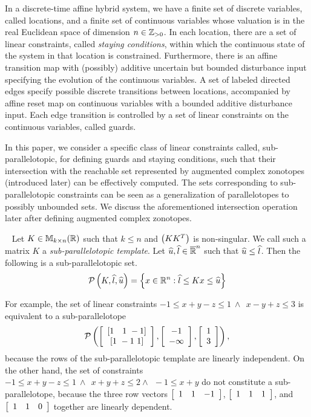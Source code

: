 
In a discrete-time affine hybrid system, we have a finite set of
discrete variables, called locations, and a finite set of continuous
variables whose valuation is in the real Euclidean space of dimension
$n\in\mathbb{Z}_{> 0}$.  In each location, there are a set of linear constraints,
called \emph{staying conditions}, within which the continuous state of
the system in that location is constrained.  Furthermore, there is an
affine transition map with (possibly) additive uncertain but bounded
disturbance input specifying the evolution of the continuous
variables. A set of labeled directed edges specify possible discrete
transitions between locations, accompanied by affine reset map on
continuous variables with a bounded additive disturbance input. Each
edge transition is controlled by a set of linear constraints on the
continuous variables, called guards.

In this paper, we consider a specific class of linear constraints
called, sub-parallelotopic, for defining guards and staying
conditions, such that their intersection with the reachable set
represented by augmented complex zonotopes (introduced later) can be
effectively computed. The sets corresponding to sub-parallelotopic
constraints can be seen as a generalization of parallelotopes to
possibly unbounded sets.  We discuss the aforementioned intersection
operation later after defining augmented complex zonotopes.
%
\begin{definition}~\label{defn:sub-parallelotope} Let
  $K\in\mathbb{M}_{k\times n}(\mathbb{R})$ such that $k\leq n$ and $\left(KK^T\right)$ is
  non-singular.  We call such a matrix $K$ a
  \emph{sub-parallelotopic template}.  Let
  $\widehat{u},\widehat{l}\in\mathbb{\overline{R}}^n$ such that $\widehat{u}\leq\widehat{l}$.  Then
  the following is a sub-parallelotopic set.
\[
\mathcal{P}\left(K,\widehat{l},\widehat{u}\right) = \left\{x\in\mathbb{R}^n: \widehat{l}\leq Kx \leq \widehat{u}\right\}
\]
\end{definition}
%
For example, the set of linear constraints $-1\leq x+y-z\leq
1~\wedge~~ x-y+z\leq 3$ is equivalent to a sub-parallelotope
$$\mathcal{P}\left(\left[\begin{array}{c}{\left[1~~~1~-1\right]}\\{\left[1~-1~1\right]} \end{array}\right],\left[\begin{array}{c}{-1}\\{-\infty} \end{array}\right],\left[\begin{array}{c}{1}\\{3} \end{array}\right]\right),$$
because the rows of the sub-parallelotopic template are linearly
independent.  On the other hand, the set of constraints $-1\leq
x+y-z\leq 1~\wedge~~x+y+z\leq 2\wedge~~-1\leq x+y$ do not constitute a
sub-parallelotope, because the three row vectors $\left[\begin{array}{c
c c}1 & 1 & -1\end{array}\right]$, $\left[\begin{array}{c c c}1 & 1 &
1\end{array}\right]$, and $\left[\begin{array}{c c c}1 & 1 &
0\end{array}\right]$ together are linearly dependent. 

